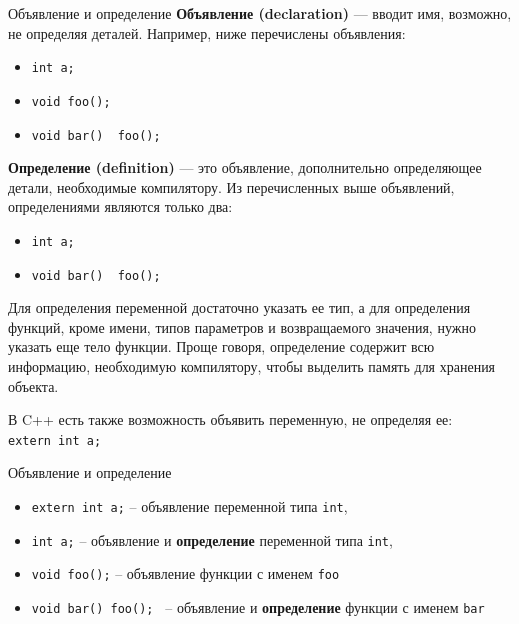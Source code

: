 \documentclass[
    9pt,
    hyperref={pdfencoding=unicode}
    ]{beamer}
\begin{document}
\begin{frame}[fragile]{Объявление и определение}
    \textbf{Объявление (declaration)} — вводит имя, возможно, не определяя деталей. Например, ниже перечислены объявления:
    \begin{itemize}
        \item \texttt{int a;}
        \item \texttt{void foo();}
        \item \texttt{void bar() { foo(); }}
    \end{itemize}

    \textbf{Определение (definition)} — это объявление, дополнительно определяющее детали, необходимые компилятору. Из перечисленных выше объявлений, определениями являются только два:
    \begin{itemize}
        \item \texttt{int a;}
        \item \texttt{void bar() { foo(); }}
    \end{itemize}

    Для определения переменной достаточно указать ее тип, а для определения функций, кроме имени, типов параметров и возвращаемого значения, нужно указать еще тело функции. Проще говоря, определение содержит всю информацию, необходимую компилятору, чтобы выделить память для хранения объекта.
    
    В C++ есть также возможность объявить переменную, не определяя ее: \\
    \texttt{extern int a;}
\end{frame}

\begin{frame}[fragile]{Объявление и определение}
    \begin{itemize}
        \item \texttt{extern int a;} -- объявление переменной типа \texttt{int},
        \item \texttt{int a;} -- объявление и \textbf{определение} переменной типа \texttt{int},
        \item \texttt{void foo();} -- объявление функции с именем \texttt{foo}
        \item \texttt{void bar(){ foo(); }} -- объявление и \textbf{определение} функции с именем \texttt{bar}
    \end{itemize}
\end{frame}
\end{document}
